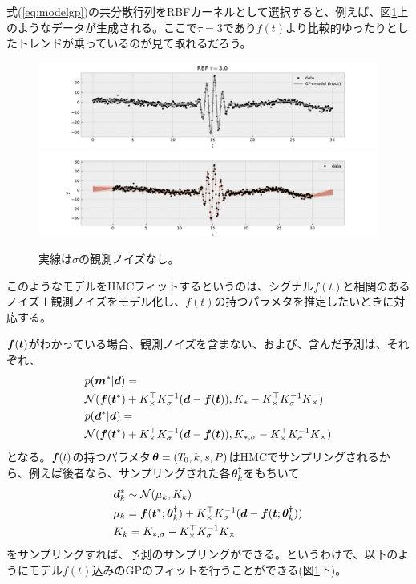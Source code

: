 式(\ref{eq:modelgp})の共分散行列をRBFカーネルとして選択すると、例えば、図\ref{fig:gp1m}上のようなデータが生成される。ここで$\tau=3$であり$f(t)$より比較的ゆったりとしたトレンドが乗っているのが見て取れるだろう。
\begin{figure}[htb]
\begin{center}
\includegraphics[width=\linewidth]{fig/gpmodel/gp1.pdf}
\includegraphics[width=\linewidth]{fig/gpmodel/gp6.pdf}
\caption{実線は$\sigma$の観測ノイズなし。\label{fig:gp1m}}
\end{center}
\end{figure}
このようなモデルをHMCフィットするというのは、シグナル$f(t)$と相関のあるノイズ＋観測ノイズをモデル化し、$f(t)$の持つパラメタを推定したいときに対応する。


$\boldsymbol{f}(\boldsymbol{t})$がわかっている場合、観測ノイズを含まない、および、含んだ予測は、それぞれ、
\begin{align}
\label{eq:predgp_model}
&p(\boldsymbol{m}^\ast|\boldsymbol{d}) =   \nonumber \\
&\mathcal{N} (\boldsymbol{f}(\boldsymbol{t}^\ast) + K_{\times}^\top K_\sigma^{-1}  (\boldsymbol{d} - \boldsymbol{f}(\boldsymbol{t})),  K_{\ast} - K_\times^\top K_\sigma^{-1} K_\times) \\
&p(\boldsymbol{d}^\ast|\boldsymbol{d}) =   \nonumber \\
&\mathcal{N} (\boldsymbol{f}(\boldsymbol{t}^\ast) + K_{\times}^\top K_\sigma^{-1} (\boldsymbol{d} - \boldsymbol{f}(\boldsymbol{t})), K_{\ast,\sigma} - K_\times^\top K_\sigma^{-1} K_\times)
\end{align}
となる。$\boldsymbol{f}(t)$の持つパラメタ$\boldsymbol{\theta}=(T_0,k,s,P)$はHMCでサンプリングされるから、例えば後者なら、サンプリングされた各$\boldsymbol{\theta}^\dagger_k$をもちいて
\begin{align}
\label{eq:predgp2_}
&\boldsymbol{d}^\ast_k \sim  \mathcal{N} (\mu_k, K_k) \\
&\mu_k = \boldsymbol{f}(\boldsymbol{t}^\ast; \boldsymbol{\theta}^\dagger_k) + K_{\times}^\top K_\sigma^{-1} (\boldsymbol{d} - \boldsymbol{f}(\boldsymbol{t}; \boldsymbol{\theta}^\dagger_k)) \\
&K_k = K_{\ast,\sigma} - K_\times^\top K_\sigma^{-1} K_\times
\end{align}
をサンプリングすれば、予測のサンプリングができる。というわけで、以下のようにモデル$f(t)$込みのGPのフィットを行うことができる(図\ref{fig:gp1m}下)。

